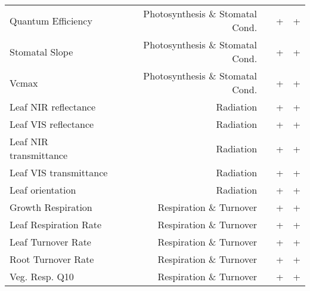 \begin{table}[!htp]
\begin{tabular}{lrrcc}
Quantum Efficiency &Photosynthesis \& Stomatal Cond. & &+ &+ \\
Stomatal Slope &Photosynthesis \& Stomatal Cond. & &+ &+ \\
Vcmax &Photosynthesis \& Stomatal Cond. & &+ &+ \\
Leaf NIR reflectance &Radiation & &+ &+ \\
Leaf VIS reflectance &Radiation & &+ &+ \\
Leaf NIR transmittance &Radiation & &+ &+ \\
Leaf VIS transmittance &Radiation & &+ &+ \\
Leaf orientation &Radiation & &+ &+ \\
Growth Respiration &Respiration \& Turnover & &+ &+ \\
Leaf Respiration Rate &Respiration \& Turnover & &+ &+ \\
Leaf Turnover Rate &Respiration \& Turnover & &+ &+ \\
Root Turnover Rate &Respiration \& Turnover & &+ &+ \\
Veg. Resp. Q10 &Respiration \& Turnover & &+ &+ \\
\bottomrule
\end{tabular}
\end{table}
